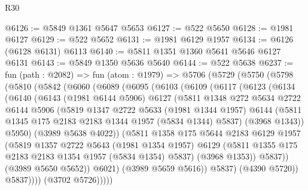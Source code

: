 \begin{lexlean}{R30}
\begin{coremodule}
@6126 := @5849 @1361 @5647 @5653
@6127 := @522 @5650
@6128 := @1981 @6127
@6129 := @522 @5652
@6131 := @1981 @6129 @1957
@6134 := @6126 (@6128 @6131) @6113
@6140 := @5811 @1351 @1360 @5641 @5646 @6127 @6131
@6143 := @5849 @1350 @5636 @5640
@6144 := @522 @5638
@6237 := fun (path : @2082) =>
  fun (atom : @1979) =>
  @5706
    (@5729
      (@5750
        (@5798
          (@5810
            (@5842
              (@6060
                (@6089
                  (@6095
                    (@6103
                      (@6109
                        (@6117
                          (@6123
                            (@6134
                              (@6140
                                (@6143
                                  (@1981 @6144 @5906)
                                  @6127
                                  (@5811
                                    @1348
                                    @272
                                    @5634
                                    @2722
                                    @6144
                                    @5906
                                    (@5819
                                      @1347
                                      @2722
                                      @5633
                                      (@1981 @1344 @1957)
                                      @6144
                                      (@5811 @1345 @175 @2183 @2183 @1344 @1957 (@5834 @1344) @5837)
                                      (@3968 @1343))
                                    @5950)
                                  (@3989 @5638 @4022))
                                (@5811
                                  @1358
                                  @175
                                  @5644
                                  @2183
                                  @6129
                                  @1957
                                  (@5819
                                    @1357
                                    @2722
                                    @5643
                                    (@1981 @1354 @1957)
                                    @6129
                                    (@5811 @1355 @175 @2183 @2183 @1354 @1957 (@5834 @1354) @5837)
                                    (@3968 @1353))
                                  @5837))
                              (@3989 @5650 @5652))
                            @6021)
                          (@3989 @5659 @5616))
                        @5837)
                      (@4390 @5720))
                    @5837))))
            (@3702 @5726)))))

\end{coremodule}
\end{lexlean}
